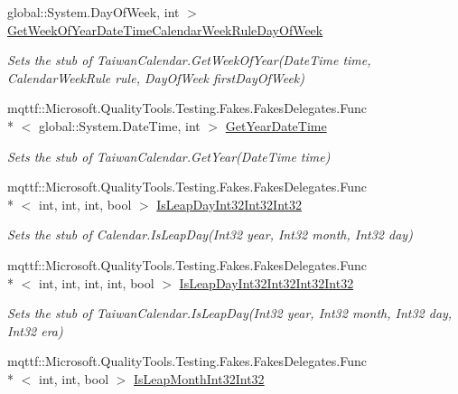 \begin{DoxyCompactItemize}
global\-::\-System.\-Day\-Of\-Week, int $>$ \hyperlink{class_system_1_1_globalization_1_1_fakes_1_1_stub_taiwan_calendar_a424c42668cfb4eb94ee56eed912bdb91}{Get\-Week\-Of\-Year\-Date\-Time\-Calendar\-Week\-Rule\-Day\-Of\-Week}
\begin{DoxyCompactList}\small\item\em Sets the stub of Taiwan\-Calendar.\-Get\-Week\-Of\-Year(\-Date\-Time time, Calendar\-Week\-Rule rule, Day\-Of\-Week first\-Day\-Of\-Week)\end{DoxyCompactList}\item 
mqttf\-::\-Microsoft.\-Quality\-Tools.\-Testing.\-Fakes.\-Fakes\-Delegates.\-Func\\*
$<$ global\-::\-System.\-Date\-Time, int $>$ \hyperlink{class_system_1_1_globalization_1_1_fakes_1_1_stub_taiwan_calendar_a5870b106e4ea666ed76437959a554e29}{Get\-Year\-Date\-Time}
\begin{DoxyCompactList}\small\item\em Sets the stub of Taiwan\-Calendar.\-Get\-Year(\-Date\-Time time)\end{DoxyCompactList}\item 
mqttf\-::\-Microsoft.\-Quality\-Tools.\-Testing.\-Fakes.\-Fakes\-Delegates.\-Func\\*
$<$ int, int, int, bool $>$ \hyperlink{class_system_1_1_globalization_1_1_fakes_1_1_stub_taiwan_calendar_a2503b6a550b665466f378cca685c0608}{Is\-Leap\-Day\-Int32\-Int32\-Int32}
\begin{DoxyCompactList}\small\item\em Sets the stub of Calendar.\-Is\-Leap\-Day(\-Int32 year, Int32 month, Int32 day)\end{DoxyCompactList}\item 
mqttf\-::\-Microsoft.\-Quality\-Tools.\-Testing.\-Fakes.\-Fakes\-Delegates.\-Func\\*
$<$ int, int, int, int, bool $>$ \hyperlink{class_system_1_1_globalization_1_1_fakes_1_1_stub_taiwan_calendar_a7687188f61ae2edc3ca07e98f68ab124}{Is\-Leap\-Day\-Int32\-Int32\-Int32\-Int32}
\begin{DoxyCompactList}\small\item\em Sets the stub of Taiwan\-Calendar.\-Is\-Leap\-Day(\-Int32 year, Int32 month, Int32 day, Int32 era)\end{DoxyCompactList}\item 
mqttf\-::\-Microsoft.\-Quality\-Tools.\-Testing.\-Fakes.\-Fakes\-Delegates.\-Func\\*
$<$ int, int, bool $>$ \hyperlink{class_system_1_1_globalization_1_1_fakes_1_1_stub_taiwan_calendar_a262e84b0323c579b62ff7e49742e1783}{Is\-Leap\-Month\-Int32\-Int32}

\end{DoxyCompactItemize}
